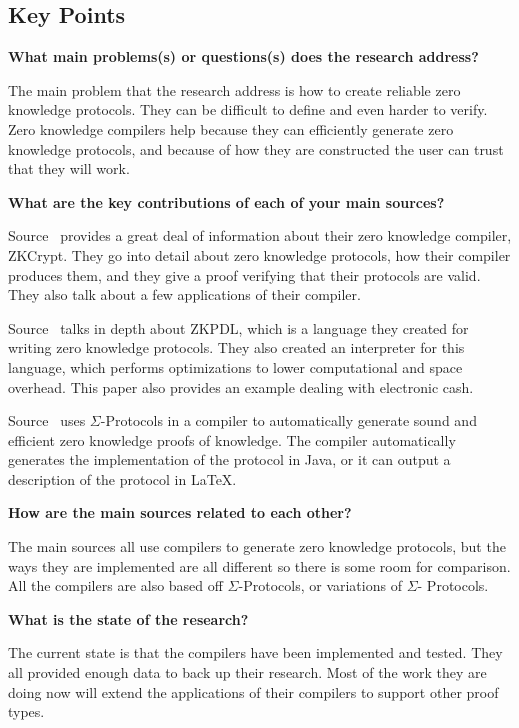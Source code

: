 \documentclass{sig-alternate}
\begin{document}
	\subsection{Key Points}
	\textbf{What main problems(s) or questions(s) does the research address?}
	
	The main problem that the research address is how to create reliable zero knowledge
	protocols. They can be difficult to define and even harder to verify. Zero knowledge
	compilers help because they can efficiently generate zero knowledge protocols, and
	because of how they are constructed the user can trust that they will work.
	
	\textbf{What are the key contributions of each of your main sources?}
	
	Source~\cite{ZKCrypt:2012} provides a great deal of information about their zero
	knowledge compiler, ZKCrypt. They go into detail about zero knowledge protocols, 
	how their compiler produces them, and they give a proof verifying that their protocols
	are valid. They also talk about a few applications of their compiler.
	
	Source~\cite{ZKPDL:2010} talks in depth about ZKPDL, which is a language they created
	for writing zero knowledge protocols. They also created an interpreter for this
	language, which performs optimizations to lower computational and space overhead.
	This paper also provides an example dealing with electronic cash.
	
	Source~\cite{Sigma:2009} uses $\Sigma$-Protocols in a compiler to automatically 
	generate sound and efficient zero knowledge proofs of knowledge. The compiler
	automatically generates the implementation of the protocol in Java, or it can output
	a description of the protocol in \LaTeX.
	
	\textbf{How are the main sources related to each other?}
	
	The main sources all use compilers to generate zero knowledge protocols, but the
	ways they are implemented are all different so there is some room for comparison.
	All the compilers are also based off $\Sigma$-Protocols, or variations of $\Sigma$-
	Protocols.
	
	\textbf{What is the state of the research?}
	
	The current state is that the compilers have been implemented and tested. They all
	provided enough data to back up their research. Most of the work they are doing now
	will extend the applications of their compilers to support other proof types.
	
\end{document}

